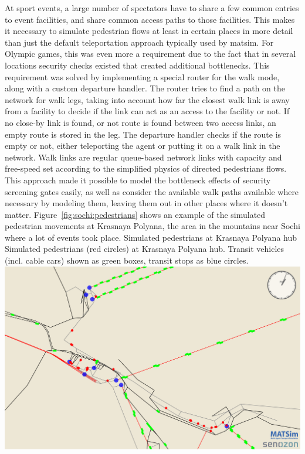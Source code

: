 At sport events, a large number of spectators have to share a few common entries
to event facilities, and share common access paths to those facilities. This
makes it necessary to simulate pedestrian flows at least in certain places in
more detail than just the default \gls{teleportation} approach typically used by
\gls{matsim}. For Olympic games, this was even more a requirement due to the fact
that in several locations security checks existed that created additional
bottlenecks. This requirement was solved by implementing a special router for
the walk mode, along with a custom departure handler. The router tries to find a
path on the network for walk legs, taking into account how far the closest walk
link is away from a facility to decide if the link can act as an access to the
facility or not. If no close-by link is found, or not route is found between
two access links, an empty route is stored in the leg. The departure handler
checks if the route is empty or not, either teleporting the agent or putting it
on a walk link in the network. Walk links are regular queue-based network links
with capacity and free-speed set according to the simplified physics of
directed pedestrians flows. This approach made it possible to model the
bottleneck effects of security screening gates easily, as well as consider the
available walk paths available where necessary by modeling them, leaving them
out in other places where it doesn't matter. Figure~\ref{fig:sochi:pedestrians}
shows an example of the simulated pedestrian movements at Krasnaya Polyana, the
area in the mountains near Sochi where a lot of events took place.  
%
\createfigure%
{Simulated pedestrians at Krasnaya Polyana hub}%
{Simulated pedestrians (red circles) at Krasnaya Polyana hub. Transit vehicles
(incl. cable cars) shown as green boxes, transit stops as blue circles.}%
{\label{fig:sochi:pedestrians}}%
{\includegraphics[width=1.\textwidth,angle=0]{./using/figures/sochi_pedestrians.pdf}}%
{}
%

